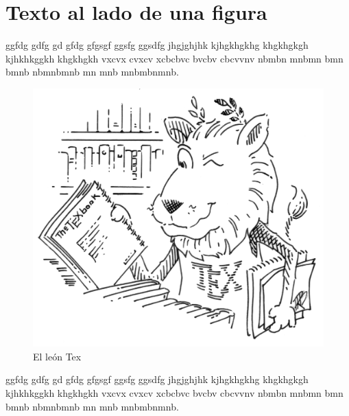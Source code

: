 \documentclass[a4paper, 12pt]{article}
\begin{document}
	
	\begin{minipage}{0.99\textwidth}
	
	\section{Texto al lado de una figura}
	ggfdg gdfg gd gfdg gfgsgf ggsfg ggsdfg jhgjghjhk kjhgkhgkhg khgkhgkgh kjhkhkggkh khgkhgkh vxcvx cvxcv xcbcbvc bvcbv cbcvvnv nbmbn mnbmn bmn bmnb nbmnbmnb mn mnb mnbmbnmnb.
	\begin{figure}
		\vspace{-5mm}
		\includegraphics[width=0.8\linewidth]{tex_lion}
		\caption{El león Tex}
		\label{fig:leontex1}
	\end{figure}
	ggfdg gdfg gd gfdg gfgsgf ggsfg ggsdfg jhgjghjhk kjhgkhgkhg khgkhgkgh kjhkhkggkh khgkhgkh vxcvx cvxcv xcbcbvc bvcbv cbcvvnv nbmbn mnbmn bmn bmnb nbmnbmnb mn mnb mnbmbnmnb.
	

\end{minipage}
\end{document}

